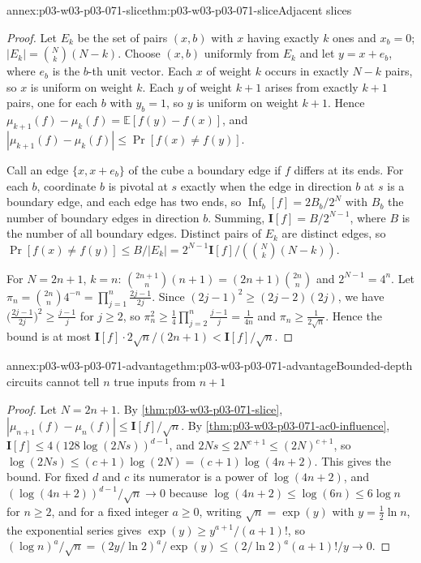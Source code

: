 \begin{annexitem}{annex:p03-w03-p03-071-slice}{thm:p03-w03-p03-071-slice}{Adjacent slices}
\begin{proof}
Let \(E_k\) be the set of pairs \((x,b)\) with \(x\) having exactly \(k\)
ones and \(x_b=0\); \(|E_k|=\binom Nk(N-k)\).  Choose \((x,b)\) uniformly
from \(E_k\) and let \(y=x+e_b\), where \(e_b\) is the \(b\)-th unit vector.
Each \(x\) of weight \(k\) occurs in exactly \(N-k\) pairs, so \(x\) is
uniform on weight \(k\).  Each \(y\) of weight \(k+1\) arises from exactly
\(k+1\) pairs, one for each \(b\) with \(y_b=1\), so \(y\) is uniform on
weight \(k+1\).  Hence
\(\mu_{k+1}(f)-\mu_k(f)=\mathbb E[f(y)-f(x)]\), and
\(|\mu_{k+1}(f)-\mu_k(f)|\leq\Pr[f(x)\neq f(y)]\).

Call an edge \(\{x,x+e_b\}\) of the cube a boundary edge if \(f\) differs at
its ends.  For each \(b\), coordinate \(b\) is pivotal at \(s\) exactly when
the edge in direction \(b\) at \(s\) is a boundary edge, and each edge has
two ends, so \(\operatorname{Inf}_b[f]=2B_b/2^N\) with \(B_b\) the number of
boundary edges in direction \(b\).  Summing, \(\mathbf I[f]=B/2^{N-1}\),
where \(B\) is the number of all boundary edges.  Distinct pairs of \(E_k\)
are distinct edges, so \(\Pr[f(x)\neq f(y)]\leq B/|E_k|=2^{N-1}\mathbf I[f]/
(\binom Nk(N-k))\).

For \(N=2n+1\), \(k=n\): \(\binom{2n+1}{n}(n+1)=(2n+1)\binom{2n}{n}\) and
\(2^{N-1}=4^n\).  Let \(\pi_n=\binom{2n}n4^{-n}=\prod_{j=1}^n\frac{2j-1}{2j}\).
Since \((2j-1)^2\geq(2j-2)(2j)\), we have
\(\bigl(\frac{2j-1}{2j}\bigr)^2\geq\frac{j-1}{j}\) for \(j\geq2\), so
\(\pi_n^2\geq\frac14\prod_{j=2}^n\frac{j-1}{j}=\frac1{4n}\) and
\(\pi_n\geq\frac1{2\sqrt n}\).  Hence the bound is at most
\(\mathbf I[f]\cdot2\sqrt n/(2n+1)<\mathbf I[f]/\sqrt n\).
\end{proof}
\end{annexitem}

\begin{annexitem}{annex:p03-w03-p03-071-advantage}{thm:p03-w03-p03-071-advantage}{Bounded-depth circuits cannot tell \(n\) true inputs from \(n+1\)}
\begin{proof}
Let \(N=2n+1\).  By \cref{thm:p03-w03-p03-071-slice},
\(|\mu_{n+1}(f)-\mu_n(f)|\leq\mathbf I[f]/\sqrt n\).  By
\cref{thm:p03-w03-p03-071-ac0-influence},
\(\mathbf I[f]\leq4(128\log(2Ns))^{d-1}\), and \(2Ns\leq2N^{c+1}\leq
(2N)^{c+1}\), so \(\log(2Ns)\leq(c+1)\log(2N)=(c+1)\log(4n+2)\).  This gives
the bound.  For fixed \(d\) and \(c\) its numerator is a power of
\(\log(4n+2)\), and \((\log(4n+2))^{d-1}/\sqrt n\to0\) because
\(\log(4n+2)\leq\log(6n)\leq6\log n\) for \(n\geq2\), and for a fixed
integer \(a\geq0\), writing \(\sqrt n=\exp(y)\) with \(y=\frac12\ln n\), the
exponential series gives \(\exp(y)\geq y^{a+1}/(a+1)!\), so
\((\log n)^a/\sqrt n=(2y/\ln2)^a/\exp(y)\leq(2/\ln2)^a(a+1)!/y\to0\).
\end{proof}
\end{annexitem}

